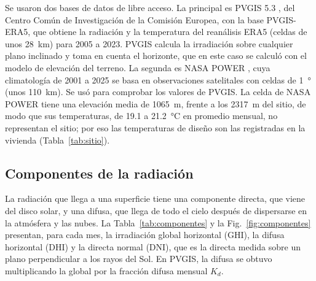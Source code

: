 Se usaron dos bases de datos de libre acceso. La principal es PVGIS 5.3 \cite{pvgis}, del Centro Común de Investigación de la Comisión Europea, con la base PVGIS-ERA5, que obtiene la radiación y la temperatura del reanálisis ERA5 (celdas de unos \SI{28}{km}) para 2005 a 2023. PVGIS calcula la irradiación sobre cualquier plano inclinado y toma en cuenta el horizonte, que en este caso se calculó con el modelo de elevación del terreno. La segunda es NASA POWER \cite{nasa_power}, cuya climatología de 2001 a 2025 se basa en observaciones satelitales con celdas de \SI{1}{\degree} (unos \SI{110}{km}). Se usó para comprobar los valores de PVGIS. La celda de NASA POWER tiene una elevación media de \SI{1065}{m}, frente a los \SI{2317}{m} del sitio, de modo que sus temperaturas, de 19.1 a \SI{21.2}{\celsius} en promedio mensual, no representan el sitio; por eso las temperaturas de diseño son las registradas en la vivienda (Tabla~\ref{tab:sitio}).

\subsection{Componentes de la radiación}

La radiación que llega a una superficie tiene una componente directa, que viene del disco solar, y una difusa, que llega de todo el cielo después de dispersarse en la atmósfera y las nubes. La Tabla~\ref{tab:componentes} y la Fig.~\ref{fig:componentes} presentan, para cada mes, la irradiación global horizontal (GHI), la difusa horizontal (DHI) y la directa normal (DNI), que es la directa medida sobre un plano perpendicular a los rayos del Sol. En PVGIS, la difusa se obtuvo multiplicando la global por la fracción difusa mensual $K_d$.

